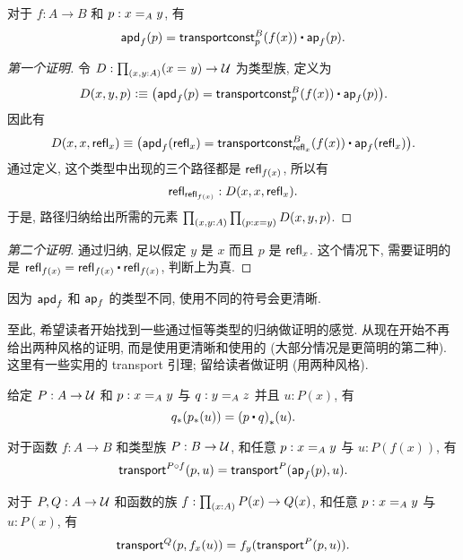 \begin{lem}
    \label{thm:apd-const}
    对于 $f:A\to B$ 和 $p:\id[A]xy$, 有
    \[ \apdfunc f(p) = \transconst B p{f(x)} \ct \apfunc f (p). \]
\end{lem}
\begin{proof}[第一个证明]
    令 $D:\prd{x,y:A} (\id xy) \to \type$ 为类型族, 定义为
    \[ D(x,y,p) \defeq \big(\apdfunc f (p) = \transconst Bp{f(x)} \ct \apfunc f (p)\big). \]
    因此有
    \[D(x,x,\refl x) \jdeq \big(\apdfunc f (\refl x) = \transconst B{\refl x}{f(x)} \ct \apfunc f ({\refl x})\big).\]
    通过定义, 这个类型中出现的三个路径都是 $\refl{f(x)}$, 所以有
    \[ \refl{\refl{f(x)}} : D(x,x,\refl x). \]
    于是, 路径归纳给出所需的元素 $\prd{x,y:A}{p:x=y} D(x,y,p)$.
\end{proof}
\begin{proof}[第二个证明]
    通过归纳, 足以假定 $y$ 是 $x$ 而且 $p$ 是 $\refl x$.
    这个情况下, 需要证明的是 $\refl{f(x)} = \refl{f(x)} \ct \refl{f(x)}$, 判断上为真.
\end{proof}

因为 $\apdfunc{f}$ 和 $\apfunc{f}$ 的类型不同, 使用不同的符号会更清晰.

%

至此, 希望读者开始找到一些通过恒等类型的归纳做证明的感觉.
从现在开始不再给出两种风格的证明, 而是使用更清晰和使用的 (大部分情况是更简明的第二种).
这里有一些实用的 transport 引理; 留给读者做证明 (用两种风格).

\begin{lem}
    \label{thm:transport-concat}
    给定 $P:A\to\type$ 和 $p:\id[A]xy$ 与 $q:\id[A]yz$ 并且 $u:P(x)$, 有
    \[ \trans{q}{\trans{p}{u}} = \trans{(p\ct q)}{u}. \]
\end{lem}

\begin{lem}
    \label{thm:transport-compose}
    对于函数 $f:A\to B$ 和类型族 $P:B\to\type$, 和任意 $p:\id[A]xy$ 与 $u:P(f(x))$, 有
    \[ \transfib{P\circ f}{p}{u} = \transfib{P}{\apfunc f(p)}{u}. \]
\end{lem}

\begin{lem}
    \label{thm:ap-transport}
    对于 $P,Q:A\to \type$ 和函数的族 $f:\prd{x:A} P(x)\to Q(x)$, 和任意 $p:\id[A]xy$ 与 $u:P(x)$, 有
    \[ \transfib{Q}{p}{f_x(u)} = f_y(\transfib{P}{p}{u}). \]
\end{lem}

%
